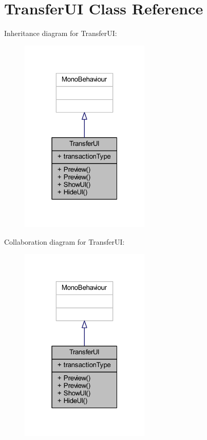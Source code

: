 \hypertarget{class_transfer_u_i}{}\section{Transfer\+UI Class Reference}
\label{class_transfer_u_i}


Inheritance diagram for Transfer\+UI\+:\nopagebreak
\begin{figure}[H]
\begin{center}
\leavevmode
\includegraphics[width=175pt]{class_transfer_u_i__inherit__graph}
\end{center}
\end{figure}


Collaboration diagram for Transfer\+UI\+:\nopagebreak
\begin{figure}[H]
\begin{center}
\leavevmode
\includegraphics[width=175pt]{class_transfer_u_i__coll__graph}
\end{center}
\end{figure}
